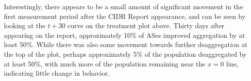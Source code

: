 Interestingly, there appears to be a small amount of significant movement in
the first measurement period after the CIDR Report appearance, and can be seen
by looking at the $t+30$ curve on the treatment plot above. Thirty days after
appearing on the report, approximately 10\% of ASes improved aggregation by at
least 50\%. While there was also some movement towards further deaggregation at
the top of the plot, perhaps approximately 5\% of the population deaggregated
by at least 50\%, with much more of the population remaining near the $x=0$
line, indicating little change in behavior.

%
%
%

